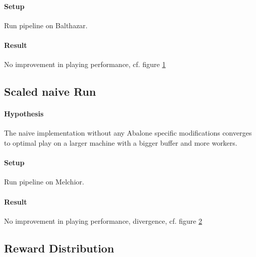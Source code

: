 \paragraph{Setup} Run pipeline on Balthazar.
\paragraph{Result} No improvement in playing performance, cf. figure \ref{performance_local_naive}
\begin{figure}[!h]
    \centering
    \hfill
    \caption{}
    \label{performance_local_naive}
\end{figure}

\subsection{Scaled naive Run}
\paragraph{Hypothesis} The naive implementation without any Abalone specific modifications converges to optimal play on a larger machine with a bigger buffer and more workers.
\paragraph{Setup} Run pipeline on Melchior.
\paragraph{Result} No improvement in playing performance, divergence, cf. figure \ref{performance_remote_naive}
\begin{figure}[!h]
    \centering
    \hfill
    \caption{}
    \label{performance_remote_naive}
\end{figure}

\subsection{Reward Distribution}
